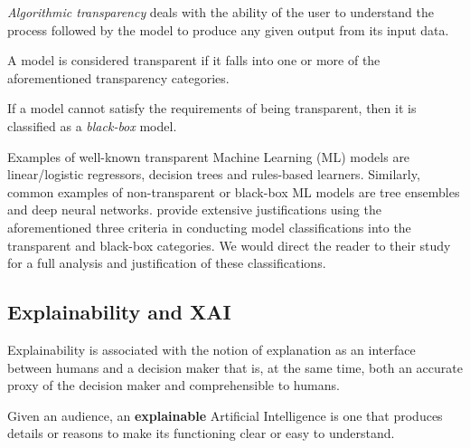 \begin{remark}
  \textit{Algorithmic transparency} deals with the ability of the user to understand the process followed by the model to produce any given output from its input data.
\end{remark}

\begin{remark}
  A model is considered transparent if it falls into one or more of the aforementioned transparency categories.
\end{remark}

\begin{remark}
  If a model cannot satisfy the requirements of being transparent, then it is classified as a \textit{black-box} model. 
\end{remark}

Examples of well-known transparent Machine Learning (ML) models are linear/logistic regressors, decision trees and rules-based learners. Similarly, common examples of non-transparent or black-box ML models are tree ensembles and deep neural networks. \citet{arrieta2020explainable} provide extensive justifications using the aforementioned three criteria in conducting model classifications into the transparent and black-box categories. We would direct the reader to their study for a full analysis and justification of these classifications.

\subsection{Explainability and XAI}

\begin{definition}
  Explainability is associated with the notion of explanation as an interface between humans and a decision maker that is, at the same time, both an accurate proxy of the decision maker and comprehensible to humans. 
\end{definition}

\begin{definition}
  Given an audience, an \textbf{explainable} Artificial Intelligence is one that produces details or reasons to make its functioning clear or easy to understand.
\end{definition}

